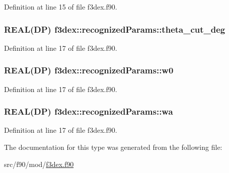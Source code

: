 Definition at line 15 of file f3dex.f90.

\hypertarget{typef3dex_1_1recognized_params_ab267c4b31f86c2a6c7937f43d62ebccd}{
\subsubsection[{theta\_\-cut\_\-deg}]{\setlength{\rightskip}{0pt plus 5cm}REAL(DP) {\bf f3dex::recognizedParams::theta\_\-cut\_\-deg}}}
\label{typef3dex_1_1recognized_params_ab267c4b31f86c2a6c7937f43d62ebccd}


Definition at line 17 of file f3dex.f90.

\hypertarget{typef3dex_1_1recognized_params_a1fefa0da05337ce61c0b29bdc6bdf74f}{
\subsubsection[{w0}]{\setlength{\rightskip}{0pt plus 5cm}REAL(DP) {\bf f3dex::recognizedParams::w0}}}
\label{typef3dex_1_1recognized_params_a1fefa0da05337ce61c0b29bdc6bdf74f}


Definition at line 17 of file f3dex.f90.

\hypertarget{typef3dex_1_1recognized_params_a31b550edf6d13cdcc677316ca61eb72e}{
\subsubsection[{wa}]{\setlength{\rightskip}{0pt plus 5cm}REAL(DP) {\bf f3dex::recognizedParams::wa}}}
\label{typef3dex_1_1recognized_params_a31b550edf6d13cdcc677316ca61eb72e}


Definition at line 17 of file f3dex.f90.



The documentation for this type was generated from the following file:\begin{DoxyCompactItemize}
\item 
src/f90/mod/\hyperlink{f3dex_8f90}{f3dex.f90}\end{DoxyCompactItemize}
